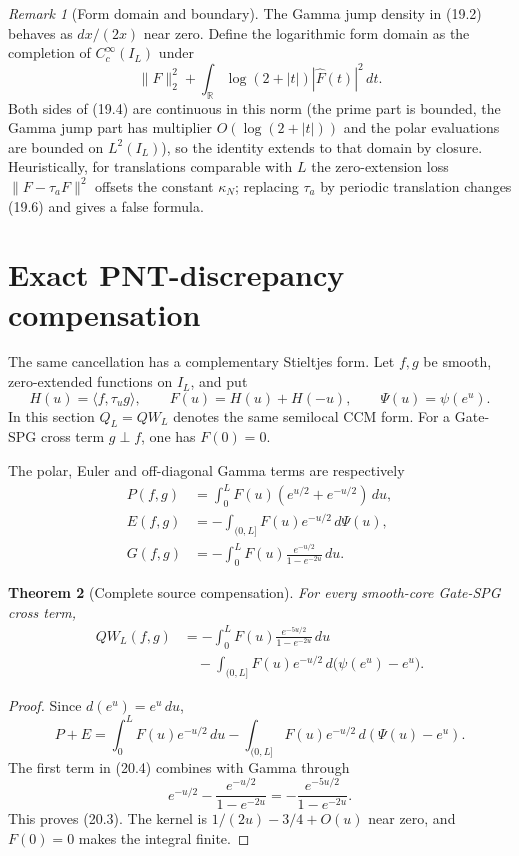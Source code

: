 \documentclass[11pt]{amsart}
\newtheorem{theorem}{Theorem}[section]
\theoremstyle{definition}
\theoremstyle{remark}
\newtheorem{remark}[theorem]{Remark}
\begin{document}
\begin{remark}[Form domain and boundary]
The Gamma jump density in (19.2) behaves as \(dx/(2x)\) near zero.  Define
the logarithmic form domain as the completion of \(C_c^\infty(I_L)\) under
\[
 \|F\|_2^2+
 \int_{\mathbb R}\log(2+|t|)|\widehat F(t)|^2\,dt.
\]
Both sides of (19.4) are continuous in this norm (the prime part is
bounded, the Gamma jump part has multiplier \(O(\log(2+|t|))\) and the
polar evaluations are bounded on \(L^2(I_L)\)), so the identity extends to
that domain by closure.  Heuristically, for translations comparable with
\(L\) the zero-extension loss \(\|F-\tau_aF\|^2\) offsets the constant
\(\kappa_N\); replacing \(\tau_a\) by periodic translation changes (19.6)
and gives a false formula.
\end{remark}

\section{Exact PNT-discrepancy compensation}
\label{sec:pnt-compensation}

The same cancellation has a complementary Stieltjes form.  Let \(f,g\) be
smooth, zero-extended functions on \(I_L\), and put
\[
 H(u)=\langle f,\tau_ug\rangle,
 \qquad F(u)=H(u)+H(-u),
 \qquad \Psi(u)=\psi(e^u).
\tag{20.1}
\]
In this section \(Q_L=QW_L\) denotes the same semilocal CCM form.
For a Gate-SPG cross term \(g\perp f\), one has \(F(0)=0\).

The polar, Euler and off-diagonal Gamma terms are respectively
\[
\begin{aligned}
 P(f,g)
 &=\int_0^L F(u)(e^{u/2}+e^{-u/2})\,du,\\
 E(f,g)
 &=-\int_{(0,L]}F(u)e^{-u/2}\,d\Psi(u),\\
 G(f,g)
 &=-\int_0^L F(u)
 \frac{e^{-u/2}}{1-e^{-2u}}\,du.
\end{aligned}
\tag{20.2}
\]

\begin{theorem}[Complete source compensation]
\label{thm:source-compensation}
For every smooth-core Gate-SPG cross term,
\[
\boxed{
\begin{aligned}
 QW_L(f,g)
 &=
 -\int_0^L
 F(u)\frac{e^{-5u/2}}{1-e^{-2u}}\,du\\
 &\quad
 -\int_{(0,L]}F(u)e^{-u/2}\,
 d\bigl(\psi(e^u)-e^u\bigr).
\end{aligned}}
\tag{20.3}
\]
\end{theorem}

\begin{proof}
Since \(d(e^u)=e^u\,du\),
\[
 P+E
 =
 \int_0^L F(u)e^{-u/2}\,du
 -\int_{(0,L]}F(u)e^{-u/2}\,d(\Psi(u)-e^u).
\tag{20.4}
\]
The first term in (20.4) combines with Gamma through
\[
 e^{-u/2}-\frac{e^{-u/2}}{1-e^{-2u}}
 =-\frac{e^{-5u/2}}{1-e^{-2u}}.
\]
This proves (20.3).  The kernel is \(1/(2u)-3/4+O(u)\) near zero, and
\(F(0)=0\) makes the integral finite.
\end{proof}
\end{document}

